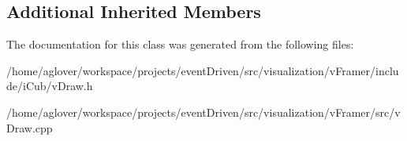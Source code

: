 \subsection*{Additional Inherited Members}


The documentation for this class was generated from the following files\-:\begin{DoxyCompactItemize}
\item 
/home/aglover/workspace/projects/event\-Driven/src/visualization/v\-Framer/include/i\-Cub/v\-Draw.\-h\item 
/home/aglover/workspace/projects/event\-Driven/src/visualization/v\-Framer/src/v\-Draw.\-cpp\end{DoxyCompactItemize}
